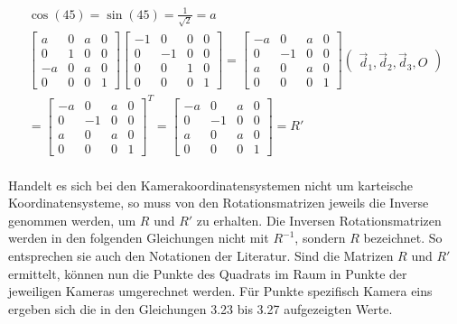 \begin{gather}
	\cos(45)=\sin(45)=\frac{1}{\sqrt{2}} = a\\
	\begin{bmatrix}
		a&0&a&0\\
		0&1&0&0\\
		-a&0&a&0\\
		0&0&0&1
	\end{bmatrix}
	\begin{bmatrix}
		-1&0&0&0\\
		0&-1&0&0\\
		0&0&1&0\\
		0&0&0&1
	\end{bmatrix}
	=\begin{bmatrix}
		-a&0&a&0\\
		0&-1&0&0\\
		a&0&a&0\\
		0&0&0&1
	\end{bmatrix}
	\begin{pmatrix}
		\vec{d}_1,\vec{d}_2,\vec{d}_3,O
	\end{pmatrix}\\
	=\begin{bmatrix}
	-a&0&a&0\\
	0&-1&0&0\\
	a&0&a&0\\
	0&0&0&1
	\end{bmatrix}^T
	=
	\begin{bmatrix}
		-a&0&a&0\\
		0&-1&0&0\\
		a&0&a&0\\
		0&0&0&1
	\end{bmatrix}
	= R'
\end{gather}\\

Handelt es sich bei den Kamerakoordinatensystemen nicht um karteische Koordinatensysteme, so muss von den Rotationsmatrizen jeweils die Inverse genommen werden, um \ensuremath{R} und \ensuremath{R'} zu erhalten. Die Inversen Rotationsmatrizen werden in den folgenden Gleichungen nicht mit $R^{-1}$, sondern $R$ bezeichnet. So entsprechen sie auch den Notationen der Literatur\cite{Elements,HZ}. Sind die Matrizen \ensuremath{R} und \ensuremath{R'} ermittelt, können nun die Punkte des Quadrats im Raum in Punkte der jeweiligen Kameras umgerechnet werden. Für Punkte spezifisch Kamera eins ergeben sich die in den Gleichungen 3.23 bis 3.27 aufgezeigten Werte.


